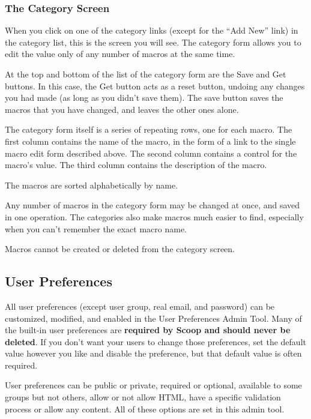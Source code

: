 \subsubsection{The Category Screen}

When you click on one of the category links (except for the ``Add New'' link) in the category list, this is the screen you will see.  The category form allows you to edit the value only of any number of macros at the same time.

At the top and bottom of the list of the category form are the Save and Get buttons.  In this case, the Get button acts as a reset button, undoing any changes you had made (as long as you didn't save them).  The save button saves the macros that you have changed, and leaves the other ones alone.

The category form itself is a series of repeating rows, one for each macro.  The first column contains the name of the macro, in the form of a link to the single macro edit form described above.  The second column contains a control for the macro's value.  The third column contains the description of the macro.

The macros are sorted alphabetically by name.

Any number of macros in the category form may be changed at once, and saved in one operation.  The categories also make macros much easier to find, especially when you can't remember the exact macro name.

Macros cannot be created or deleted from the category screen.

\subsection{User Preferences}
\label{admin-tools-user-preferences}

All user preferences (except user group, real email, and password) can be customized, modified, and enabled in the User Preferences Admin Tool. Many of the built-in user preferences are {\bf required by Scoop and should never be deleted}. If you don't want your users to change those preferences, set the default value however you like and disable the preference, but that default value is often required.

User preferences can be public or private, required or optional, available to some groups but not others, allow or not allow HTML, have a specific validation process or allow any content. All of these options are set in this admin tool.

